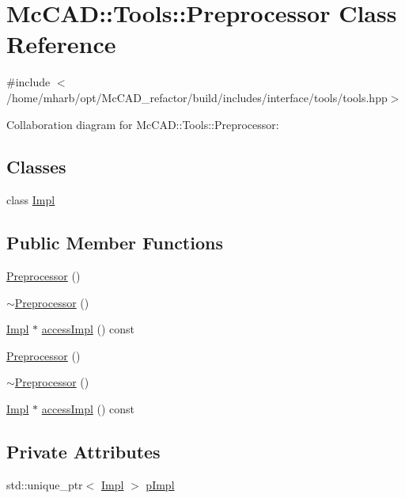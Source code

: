 \hypertarget{classMcCAD_1_1Tools_1_1Preprocessor}{}\section{Mc\+C\+AD\+:\+:Tools\+:\+:Preprocessor Class Reference}
\label{classMcCAD_1_1Tools_1_1Preprocessor}


{\ttfamily \#include $<$/home/mharb/opt/\+Mc\+C\+A\+D\+\_\+refactor/build/includes/interface/tools/tools.\+hpp$>$}



Collaboration diagram for Mc\+C\+AD\+:\+:Tools\+:\+:Preprocessor\+:
\subsection*{Classes}
\begin{DoxyCompactItemize}
\item 
class \hyperlink{classMcCAD_1_1Tools_1_1Preprocessor_1_1Impl}{Impl}
\end{DoxyCompactItemize}
\subsection*{Public Member Functions}
\begin{DoxyCompactItemize}
\item 
\hyperlink{classMcCAD_1_1Tools_1_1Preprocessor_a53fbaa9570b7fc8832712eb634402d23}{Preprocessor} ()
\item 
\hyperlink{classMcCAD_1_1Tools_1_1Preprocessor_a7d2535e0da6d09c5b6a6e83f20c6a054}{$\sim$\+Preprocessor} ()
\item 
\hyperlink{classMcCAD_1_1Tools_1_1Preprocessor_1_1Impl}{Impl} $\ast$ \hyperlink{classMcCAD_1_1Tools_1_1Preprocessor_a4c3af2d4d7d8136a1b72ef8e7cde2c61}{access\+Impl} () const
\item 
\hyperlink{classMcCAD_1_1Tools_1_1Preprocessor_a53fbaa9570b7fc8832712eb634402d23}{Preprocessor} ()
\item 
\hyperlink{classMcCAD_1_1Tools_1_1Preprocessor_a7d2535e0da6d09c5b6a6e83f20c6a054}{$\sim$\+Preprocessor} ()
\item 
\hyperlink{classMcCAD_1_1Tools_1_1Preprocessor_1_1Impl}{Impl} $\ast$ \hyperlink{classMcCAD_1_1Tools_1_1Preprocessor_adaa5582f350b8bc3008d3bdf4faa432d}{access\+Impl} () const
\end{DoxyCompactItemize}
\subsection*{Private Attributes}
\begin{DoxyCompactItemize}
\item 
std\+::unique\+\_\+ptr$<$ \hyperlink{classMcCAD_1_1Tools_1_1Preprocessor_1_1Impl}{Impl} $>$ \hyperlink{classMcCAD_1_1Tools_1_1Preprocessor_acd2ccc9134184b465a4ea2de5df90468}{p\+Impl}
\end{DoxyCompactItemize}


